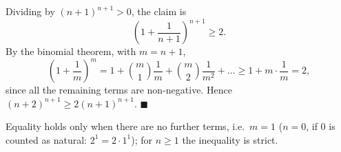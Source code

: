 Dividing by $(n+1)^{n+1}>0$, the claim is
\[
\left(1+\dfrac{1}{n+1}\right)^{n+1}\ge2 .
\]
By the binomial theorem, with $m=n+1$,
\[
\left(1+\dfrac{1}{m}\right)^m=1+\binom m1\dfrac{1}{m}+\binom m2\dfrac{1}{m^2}+\dots\ge1+m\cdot\dfrac{1}{m}=2,
\]
since all the remaining terms are non-negative. Hence $(n+2)^{n+1}\ge2(n+1)^{n+1}$. $\blacksquare$

Equality holds only when there are no further terms, i.e.\ $m=1$ ($n=0$, if $0$ is counted as natural: $2^1=2\cdot1^1$); for $n\ge1$ the inequality is strict.
